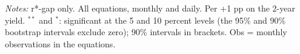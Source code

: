 \begin{flushleft}\footnotesize\textit{Notes:} r*-gap only. All equations, monthly and daily. Per +1 pp on the 2-year yield. $^{**}$ and $^{*}$: significant at the 5 and 10 percent levels (the 95\% and 90\% bootstrap intervals exclude zero); 90\% intervals in brackets. Obs = monthly observations in the equations.\end{flushleft}
\endgroup
